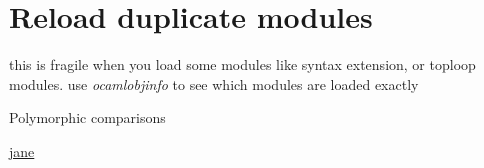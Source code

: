 
\section{Reload duplicate modules }

 this is fragile when you load some modules like syntax extension, or toploop modules. use \textit{ocamlobjinfo} to
  see which modules are loaded exactly


Polymorphic comparisons

\href{https://ocaml.janestreet.com/?q=node/33}{jane}
